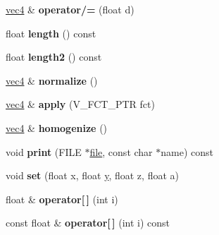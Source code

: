 \begin{DoxyCompactItemize}
\item 
\hypertarget{classvec4_a0fef5587e25bbb396685e410820f80a5}{\hyperlink{classvec4}{vec4} \& {\bfseries operator/=} (float d)}\label{classvec4_a0fef5587e25bbb396685e410820f80a5}

\item 
\hypertarget{classvec4_aa1c5dd86c8fbde45d6b6beabe45487e2}{float {\bfseries length} () const }\label{classvec4_aa1c5dd86c8fbde45d6b6beabe45487e2}

\item 
\hypertarget{classvec4_a0b43d50e90a42fd019f57d85ef7c3966}{float {\bfseries length2} () const }\label{classvec4_a0b43d50e90a42fd019f57d85ef7c3966}

\item 
\hypertarget{classvec4_a13ccaff64d17779921fabd9d65396a4b}{\hyperlink{classvec4}{vec4} \& {\bfseries normalize} ()}\label{classvec4_a13ccaff64d17779921fabd9d65396a4b}

\item 
\hypertarget{classvec4_ae4787582447129f06bded51177bc07a6}{\hyperlink{classvec4}{vec4} \& {\bfseries apply} (V\+\_\+\+F\+C\+T\+\_\+\+P\+T\+R fct)}\label{classvec4_ae4787582447129f06bded51177bc07a6}

\item 
\hypertarget{classvec4_af44a87b94fd71ec7d78643e81124faf5}{\hyperlink{classvec4}{vec4} \& {\bfseries homogenize} ()}\label{classvec4_af44a87b94fd71ec7d78643e81124faf5}

\item 
\hypertarget{classvec4_a47d22c2d3f88febd80522bea183cee53}{void {\bfseries print} (F\+I\+L\+E $\ast$\hyperlink{structfile}{file}, const char $\ast$name) const }\label{classvec4_a47d22c2d3f88febd80522bea183cee53}

\item 
\hypertarget{classvec4_a858b6b49f7476e4079d7e8d8becb2e03}{void {\bfseries set} (float x, float \hyperlink{_ice_utils_8h_aa7ffaed69623192258fb8679569ff9ba}{y}, float z, float a)}\label{classvec4_a858b6b49f7476e4079d7e8d8becb2e03}

\item 
\hypertarget{classvec4_a2fbcfeb37dd07ace177c61b7caa9c4fa}{float \& {\bfseries operator\mbox{[}$\,$\mbox{]}} (int i)}\label{classvec4_a2fbcfeb37dd07ace177c61b7caa9c4fa}

\item 
\hypertarget{classvec4_a8ff3a10e2e76c7fe7cb827c7094481aa}{const float \& {\bfseries operator\mbox{[}$\,$\mbox{]}} (int i) const }\label{classvec4_a8ff3a10e2e76c7fe7cb827c7094481aa}

\end{DoxyCompactItemize}
